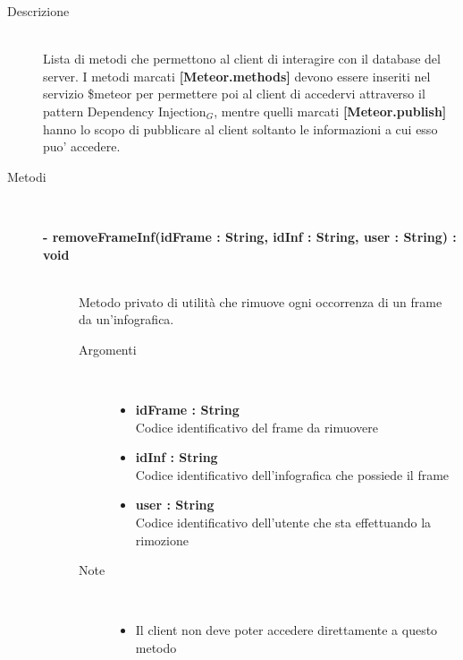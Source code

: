 \begin{description}
\item[Descrizione] \hfill \\
	Lista di metodi che permettono al client di interagire con il database del server. I metodi marcati \textbf{[Meteor.methods]} devono essere inseriti nel servizio \$meteor per permettere poi al client di accedervi attraverso il pattern Dependency Injection$_G$, mentre quelli marcati \textbf{[Meteor.publish]} hanno lo scopo di pubblicare al client soltanto le informazioni a cui esso puo' accedere.
	
	
\item[Metodi] \hfill \\

	\begin{description}
		\item[\textbf{\color{blue}- removeFrameInf(idFrame : String, idInf : String, user : String) : void			}] \hfill \\
			Metodo privato di utilità che rimuove ogni occorrenza di un frame da un'infografica.
			
		\begin{description}
			\item[Argomenti] \hfill \\
				\begin{itemize}
				
					\item \textbf{idFrame : String			} \hfill \\
					Codice identificativo del frame da rimuovere
					\item \textbf{idInf : String		} \hfill \\
					Codice identificativo dell'infografica che possiede il frame
					\item \textbf{user : String			} \hfill \\
					Codice identificativo dell'utente che sta effettuando la rimozione
					
				\end{itemize}
			\item[Note] \hfill \\
			\begin{itemize}
					\item Il client non deve poter accedere direttamente a questo metodo
				\end{itemize}
		\end{description}
	\end{description}
	

\end{description}
